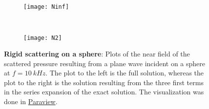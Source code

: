 \begin{figure}
	\centering
	\begin{subfigure}[t]{0.48\textwidth}
		\centering
		\texttt{[image: Ninf]}
		\label{Fig5:S1Ninf}
	\end{subfigure}
	~
	\begin{subfigure}[t]{0.48\textwidth}
		\centering
		\texttt{[image: N2]}
		\label{Fig5:S1N2}
	\end{subfigure}
	\caption{\textbf{Rigid scattering on a sphere}: Plots of the near field of the scattered pressure resulting from a plane wave incident on a sphere at $f=\SI{10}{kHz}$. The plot to the left is the full solution, whereas the plot to the right is the solution resulting from the three first terms in the series expansion of the exact solution. The visualization was done in \href{http://www.paraview.org/}{Paraview}.}
	\label{Fig5:Benchmarks_NearField}
\end{figure}

